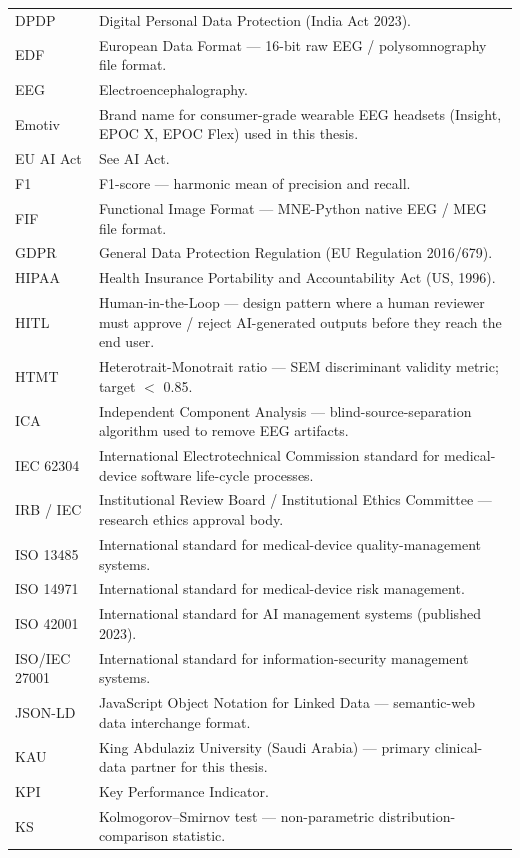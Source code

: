 {\begin{xltabular}{\textwidth}{@{} >{\raggedright\arraybackslash}p{2.6cm} L @{}}
DPDP & Digital Personal Data Protection (India Act 2023). \\
EDF & European Data Format --- 16-bit raw EEG / polysomnography file format. \\
EEG & Electroencephalography. \\
Emotiv & Brand name for consumer-grade wearable EEG headsets (Insight, EPOC X, EPOC Flex) used in this thesis. \\
EU AI Act & See AI Act. \\
F1 & F1-score --- harmonic mean of precision and recall. \\
FIF & Functional Image Format --- MNE-Python native EEG / MEG file format. \\
GDPR & General Data Protection Regulation (EU Regulation 2016/679). \\
HIPAA & Health Insurance Portability and Accountability Act (US, 1996). \\
HITL & Human-in-the-Loop --- design pattern where a human reviewer must approve / reject AI-generated outputs before they reach the end user. \\
HTMT & Heterotrait-Monotrait ratio --- SEM discriminant validity metric; target $<$ 0.85. \\
ICA & Independent Component Analysis --- blind-source-separation algorithm used to remove EEG artifacts. \\
IEC 62304 & International Electrotechnical Commission standard for medical-device software life-cycle processes. \\
IRB / IEC & Institutional Review Board / Institutional Ethics Committee --- research ethics approval body. \\
ISO 13485 & International standard for medical-device quality-management systems. \\
ISO 14971 & International standard for medical-device risk management. \\
ISO 42001 & International standard for AI management systems (published 2023). \\
ISO/IEC 27001 & International standard for information-security management systems. \\
JSON-LD & JavaScript Object Notation for Linked Data --- semantic-web data interchange format. \\
KAU & King Abdulaziz University (Saudi Arabia) --- primary clinical-data partner for this thesis. \\
KPI & Key Performance Indicator. \\
KS & Kolmogorov--Smirnov test --- non-parametric distribution-comparison statistic. \\

\end{xltabular}}
